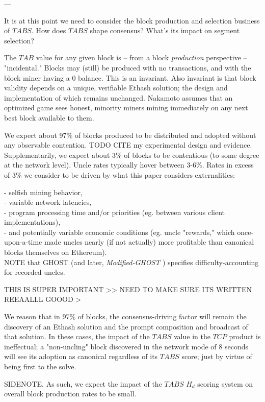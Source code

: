 \documentclass[11pt]{article}
\theoremstyle{plain}
\newcommand{\mghost}{\textit{Modified-GHOST }}
\begin{document}
---

It is at this point we need to consider the block production and selection
business of $TABS$.
How does $TABS$ shape consensus? What's its impact on segment selection?

The $TAB$ value for any given block is -- from a block \textit{production}
perspective -- "incidental."
Blocks may (still) be produced with no transactions, and with the block miner
having a 0 balance. This is an invariant.
Also invariant is that block validity depends on a unique, verifiable Ethash
solution; the design and implementation of which remains unchanged.
Nakamoto assumes that an optimized game sees honest, minority miners mining
immediately on any next best block available to them.

We expect about 97\% of blocks produced to be distributed and adopted without
any observable contention. TODO CITE my experimental design and evidence.
Supplementarily, we expect about 3\% of blocks to be contentious (to some
degree at the network level).
Uncle rates typically hover between 3-6\%. Rates in excess of 3\% we consider
to be driven by what this paper considers externalities:

- selfish mining behavior, \\
- variable network latencies, \\
- program processing time and/or priorities (eg. between various client
implementations), \\
- and potentially variable economic conditions (eg. uncle "rewards," which
once-upon-a-time made uncles nearly (if not actually) more profitable than
canonical blocks themselves on Ethereum). \\

NOTE that GHOST (and later, \mghost) specifies difficulty-accounting
for recorded uncles.

THIS IS SUPER IMPORTANT >> NEED TO MAKE SURE ITS WRITTEN REEAALLL GOOOD >

We reason that in 97\% of blocks, the consensus-driving factor will remain the
discovery of an Ethash solution and the prompt composition and broadcast of
that solution.
In these cases, the impact of the $TABS$ value in the $TCP$ product is
ineffectual; a "non-uncling" block discovered in the network mode of 8 seconds
will see
its adoption as canonical regardless of its $TABS$ score; just by virtue of
being first to the solve.

SIDENOTE. As such, we expect the impact of the $TABS$ \times $H_{d}$ scoring
system on overall block production rates to be small.
\end{document}
